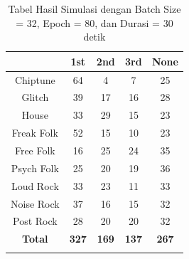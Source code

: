 \begin{longtable}[c]{|c|c|c|c|c|}
	\hline
	\textbf{}      & \textbf{1st} & \textbf{2nd} & \textbf{3rd} & \textbf{None} \\ \hline
	\endfirsthead
	\endhead
	Chiptune       & 64           & 4            & 7            & 25            \\ \hline
	Glitch         & 39           & 17           & 16           & 28            \\ \hline
	House          & 33           & 29           & 15           & 23            \\ \hline
	Freak Folk     & 52           & 15           & 10           & 23            \\ \hline
	Free Folk      & 16           & 25           & 24           & 35            \\ \hline
	Psych Folk     & 25           & 20           & 19           & 36            \\ \hline
	Loud Rock      & 33           & 23           & 11           & 33            \\ \hline
	Noise Rock     & 37           & 16           & 15           & 32            \\ \hline
	Post Rock      & 28           & 20           & 20           & 32            \\ \hline
	\textbf{Total} & \textbf{327} & \textbf{169} & \textbf{137} & \textbf{267}  \\ \hline
	\caption{Tabel Hasil Simulasi dengan Batch Size = 32, Epoch = 80, dan Durasi = 30 detik}
	\label{tab:my-table}\\
\end{longtable}


